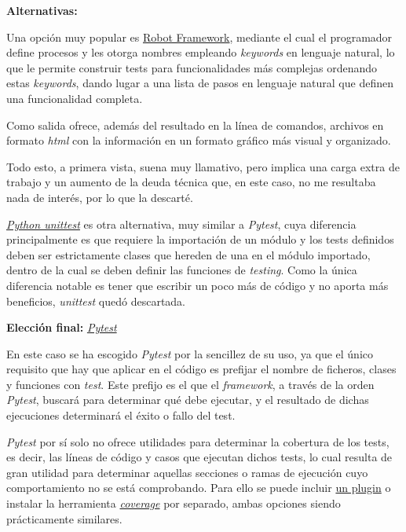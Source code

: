 \textbf{Alternativas:}

Una opción muy popular es \href{https://robotframework.org/}{Robot Framework}, mediante el cual el programador define procesos y les otorga nombres empleando \textit{keywords} en lenguaje natural, lo que le permite construir tests para funcionalidades más complejas ordenando estas \textit{keywords}, dando lugar a una lista de pasos en lenguaje natural que definen una funcionalidad completa.

Como salida ofrece, además del resultado en la línea de comandos, archivos en formato \textit{html} con la información en un formato gráfico más visual y organizado.

Todo esto, a primera vista, suena muy llamativo, pero implica una carga extra de trabajo y un aumento de la deuda técnica que, en este caso, no me resultaba nada de interés, por lo que la descarté.

\href{https://docs.python.org/3/library/unittest.html}{\textit{Python unittest}} es otra alternativa, muy similar a \textit{Pytest}, cuya diferencia principalmente es que requiere la importación de un módulo y los tests definidos deben ser estrictamente clases que hereden de una en el módulo importado, dentro de la cual se deben definir las funciones de \textit{testing}. Como la única diferencia notable es tener que escribir un poco más de código y no aporta más beneficios, \textit{unittest} quedó descartada.

\textbf{Elección final:} \href{https://docs.Pytest.org/}{\textit{Pytest}}

En este caso se ha escogido \textit{Pytest} por la sencillez de su uso, ya que el único requisito que hay que aplicar en el código es prefijar el nombre de ficheros, clases y funciones con \textit{test}. Este prefijo es el que el \textit{framework}, a través de la orden \textit{Pytest}, buscará para determinar qué debe ejecutar, y el resultado de dichas ejecuciones determinará el éxito o fallo del test.

\textit{Pytest} por sí solo no ofrece utilidades para determinar la cobertura de los tests, es decir, las líneas de código y casos que ejecutan dichos tests, lo cual resulta de gran utilidad para determinar aquellas secciones o ramas de ejecución cuyo comportamiento no se está comprobando. Para ello se puede incluir \href{https://pypi.org/project/pytest-cov/}{un plugin} o instalar la herramienta \href{https://coverage.readthedocs.io/}{\textit{coverage}} por separado, ambas opciones siendo prácticamente similares.


